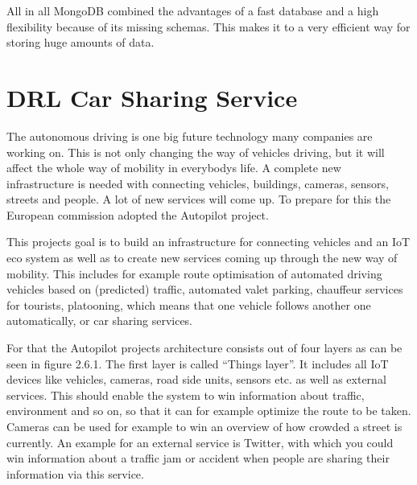 All in all MongoDB combined the advantages of a fast database and a high flexibility because of its missing schemas. This makes it to a very efficient way for storing huge amounts of data.

\section{DRL Car Sharing Service}

The autonomous driving is one big future technology many companies are working on. This is not only changing the way of vehicles driving, but it will affect the whole way of mobility in everybodys life. A complete new infrastructure is needed with connecting vehicles, buildings, cameras, sensors, streets and people. A lot of new services will come up. To prepare for this the European commission adopted the Autopilot project.

This projects goal is to build an infrastructure for connecting vehicles and an IoT eco system as well as to create new services coming up through the new way of mobility. This includes for example route optimisation of automated driving vehicles based on (predicted) traffic, automated valet parking, chauffeur services for tourists, platooning, which means that one vehicle follows another one automatically, or car sharing services. 

For that the Autopilot projects architecture consists out of four layers as can be seen in figure 2.6.1. The first layer is called ``Things layer''. It includes all IoT devices like vehicles, cameras, road side units, sensors etc. as well as external services. This should enable the system to win information about traffic, environment and so on, so that it can for example optimize the route to be taken. Cameras can be used for example to win an overview of how crowded a street is currently. An example for an external service is Twitter, with which you could win information about a traffic jam or accident when people are sharing their information via this service.


